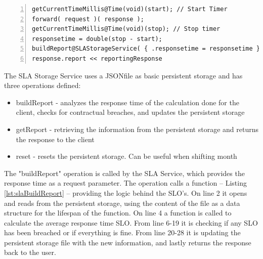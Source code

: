 \documentclass[12pt]{article}
\begin{document}
\begin{lstlisting}[caption=Courier operation for the SLA service, 
captionpos=b, label={lst:courierSLA}, frame=single, breaklines=true, numbers=left, basicstyle=\scriptsize]
getCurrentTimeMillis@Time(void)(start); // Start Timer
forward( request )( response );
getCurrentTimeMillis@Time(void)(stop); // Stop timer
responsetime = double(stop - start);
buildReport@SLAStorageService( { .responsetime = responsetime } )( reportingResponse );
response.report << reportingResponse
\end{lstlisting}

The SLA Storage Service uses a JSON\-file as basic persistent storage and has three operations defined:
\begin{itemize}
    \item buildReport - analyzes the response time of the calculation done for the client, checks for contractual breaches, and updates the persistent storage
    \item getReport - retrieving the information from the persistent storage and returns the response to the client
    \item reset - resets the persistent storage. Can be useful when shifting month
\end{itemize}

The "buildReport" operation is called by the SLA Service, which provides the response time as a request parameter. The operation calls a function -- Listing \ref{lst:slaBuildReport} -- providing the logic behind the SLO's. On line 2 it opens and reads from the persistent storage, using the content of the file as a data structure for the lifespan of the function. On line 4 a function is called to calculate the average response time SLO. From line 6-19 it is checking if any SLO has been breached or if everything is fine. From line 20-28 it is updating the persistent storage file with the new information, and lastly returns the response back to the user. 
\end{document}
